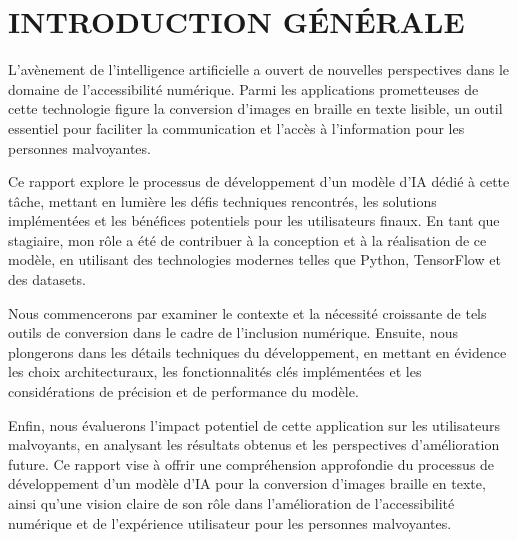 \chapter*{INTRODUCTION GÉNÉRALE}
\adjustmtc
\thispagestyle{MyStyle}


L'avènement de l'intelligence artificielle a ouvert de nouvelles perspectives dans le domaine de l'accessibilité numérique. Parmi les applications prometteuses de cette technologie figure la conversion d'images en braille en texte lisible, un outil essentiel pour faciliter la communication et l'accès à l'information pour les personnes malvoyantes.

Ce rapport explore le processus de développement d'un modèle d'IA dédié à cette tâche, mettant en lumière les défis techniques rencontrés, les solutions implémentées et les bénéfices potentiels pour les utilisateurs finaux. En tant que stagiaire, mon rôle a été de contribuer à la conception et à la réalisation de ce modèle, en utilisant des technologies modernes telles que Python, TensorFlow et des datasets.

Nous commencerons par examiner le contexte et la nécessité croissante de tels outils de conversion dans le cadre de l'inclusion numérique. Ensuite, nous plongerons dans les détails techniques du développement, en mettant en évidence les choix architecturaux, les fonctionnalités clés implémentées et les considérations de précision et de performance du modèle.

Enfin, nous évaluerons l'impact potentiel de cette application sur les utilisateurs malvoyants, en analysant les résultats obtenus et les perspectives d'amélioration future. Ce rapport vise à offrir une compréhension approfondie du processus de développement d'un modèle d'IA pour la conversion d'images braille en texte, ainsi qu'une vision claire de son rôle dans l'amélioration de l'accessibilité numérique et de l'expérience utilisateur pour les personnes malvoyantes.\par

